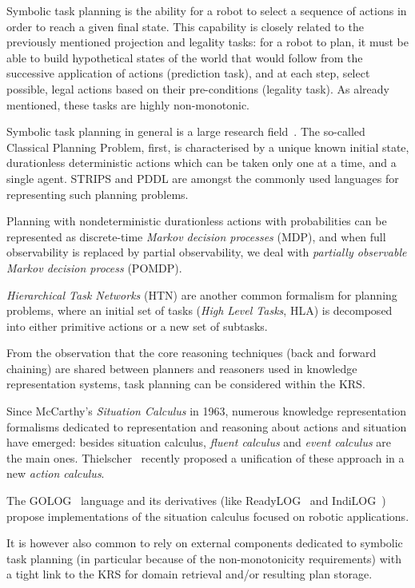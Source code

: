 Symbolic task planning is the ability for a robot to select a sequence of
actions in order to reach a given final state. This capability is closely
related to the previously mentioned projection and legality tasks: for a robot
to plan, it must be able to build hypothetical states of the world that would
follow from the successive application of actions (prediction task), and at
each step, select possible, legal actions based on their pre-conditions
(legality task). As already mentioned, these tasks are highly non-monotonic.


Symbolic task planning in general is a large research
field~\cite{Russell2009planning}. The so-called Classical Planning Problem,
first, is characterised by a unique known initial state, durationless
deterministic actions which can be taken only one at a time, and a single
agent. STRIPS and PDDL are amongst the commonly used languages for representing
such planning problems.

Planning with nondeterministic durationless actions with probabilities can be
represented as discrete-time \emph{Markov decision processes} (MDP), and when
full observability is replaced by partial observability, we deal with
\emph{partially observable Markov decision process} (POMDP).

\emph{Hierarchical Task Networks} (HTN) are another common formalism for
planning problems, where an initial set of tasks (\emph{High Level Tasks}, HLA)
is decomposed into either primitive actions or a new set of subtasks.

From the observation that the core reasoning techniques (back and forward
chaining) are shared between planners and reasoners used in knowledge
representation systems, task planning can be considered within the KRS.

Since McCarthy's \emph{Situation Calculus} in 1963, numerous knowledge
representation formalisms dedicated to representation and reasoning about
actions and situation have emerged: besides situation calculus, \emph{fluent
calculus} and \emph{event calculus} are the main ones.
Thielscher~\cite{Thielscher2011} recently proposed a unification of these
approach in a new \emph{action calculus}.

The GOLOG~\cite{Levesque1997} language and its derivatives (like {\sc
ReadyLOG}~\cite{Ferrein2008} and {\sc IndiLOG}~\cite{Gspandl2011}) propose
implementations of the situation calculus focused on robotic applications.


It is however also common to rely on external components dedicated to symbolic task
planning (in particular because of the non-monotonicity requirements) with a
tight link to the KRS for domain retrieval and/or resulting plan storage.

